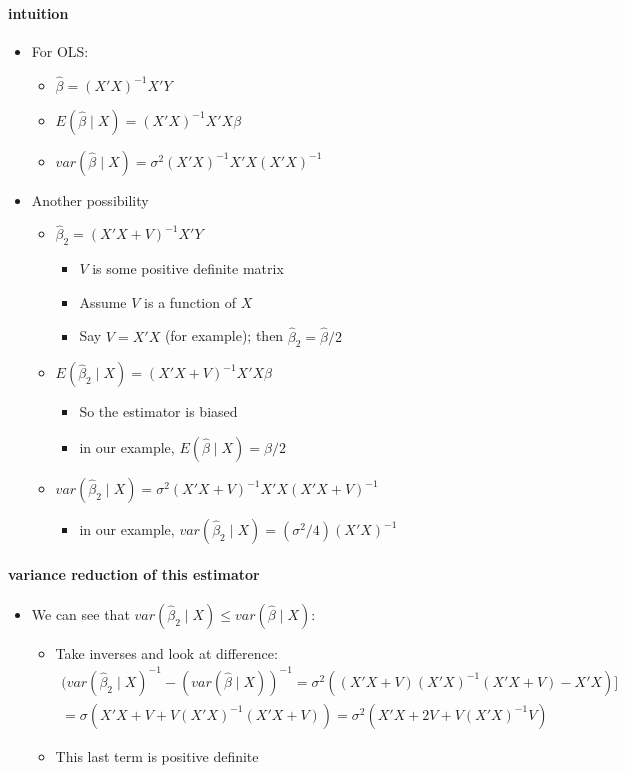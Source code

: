\paragraph{intuition}
\begin{itemize}
\item For OLS:
\begin{itemize}
\item $\hat{\beta} = (X'X)^{-1}X'Y$
\item $E(\hat{\beta} \mid X) = (X'X)^{-1}X'X\beta$
\item $var(\hat{\beta} \mid X) = \sigma^{2}(X'X)^{-1} X'X (X'X)^{-1}$
\end{itemize}
\item Another possibility
\begin{itemize}
\item $\hat{\beta}_{2} = (X'X + V)^{-1}X'Y$
\begin{itemize}
\item $V$ is some positive definite matrix
\item Assume $V$ is a function of $X$
\item Say $V = X'X$ (for example); then $\hat{\beta}_{2} =
            \hat{\beta} / 2$
\end{itemize}
\item $E(\hat{\beta}_{2} \mid X) = (X'X + V)^{-1}X'X\beta$
\begin{itemize}
\item So the estimator is biased
\item in our example, $E(\hat{\beta} \mid X) = \beta/2$
\end{itemize}
\item $var(\hat{\beta}_{2} \mid X) = \sigma^{2} (X'X +
          V)^{-1}X'X(X'X + V)^{-1}$
\begin{itemize}
\item in our example, $var(\hat{\beta}_{2} \mid X) = (\sigma^{2}/4) (X'X)^{-1}$
\end{itemize}
\end{itemize}
\end{itemize}

\paragraph{variance reduction of this estimator}
\begin{itemize}
\item We can see that $var(\hat{\beta}_{2} \mid X) \leq
        var(\hat{\beta} \mid X)$:
\begin{itemize}
\item Take inverses and look at difference:
          \begin{multline*}(var(\hat{\beta}_{2} \mid X)^{-1} -
          (var(\hat{\beta} \mid X))^{-1} = \sigma^{2}((X'X +
          V)(X'X)^{-1}(X'X + V) - X'X) ]\\= \sigma (X'X + V +
          V(X'X)^{-1}(X'X + V)) = \sigma^{2} (X'X + 2 V +
          V(X'X)^{-1}V) 
          \end{multline*}
\item This last term is positive definite
\end{itemize}
\end{itemize}

